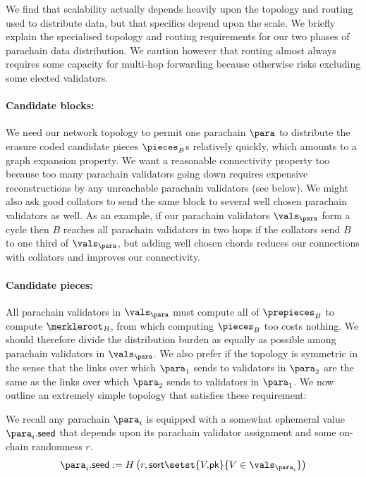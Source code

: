 We find that scalability actually depends heavily upon the topology and routing used to distribute data, but that specifics depend upon the scale.  We briefly explain the specialised topology and routing requirements for our two phases of parachain data distribution.  We caution however that routing almost always requires some capacity for multi-hop forwarding because otherwise risks excluding some elected validators.  

\smallskip
\paragraph{Candidate blocks:}

We need our network topology to permit one parachain $\para$ to distribute the erasure coded candidate pieces $\pieces_B$s relatively quickly, which amounts to a graph expansion property.  We want a reasonable connectivity property too because too many parachain validators going down requires expensive reconstructions by any unreachable parachain validators (see  below).  We might also ask good collators to send the same block to several well chosen parachain validators as well.  As an example, if our parachain validators $\vals_\para$ form a cycle then $B$ reaches all parachain validators in two hops if the collators send $B$ to one third of $\vals_\para$, but adding well chosen chords reduces our connections with collators and improves our connectivity.  

\smallskip
\paragraph{Candidate pieces:}

All parachain validators in $\vals_\para$ must compute all of $\prepieces_B$ to compute $\merkleroot_B$, from which computing $\pieces_B$ too costs nothing.  We should therefore divide the distribution burden as equally as possible among parachain validators in $\vals_\para$.  We also prefer if the topology is symmetric in the sense that the links over which $\para_1$ sends to validators in $\para_2$ are the same as the links over which $\para_2$ sends to validators in $\para_1$.  We now outline an extremely simple topology that satisfies these requirement:

We recall any parachain $\para_i$ is equipped with a somewhat ephemeral value $\para_i.\mathsf{seed}$ that depends upon its parachain validator assignment and some on-chain randomness $r$.
$$ \para_i.\mathsf{seed} := H\left( r, \mathsf{sort} \setst{ V.\mathsf{pk} }{ V \in \vals_{\para_i} } \right) $$

